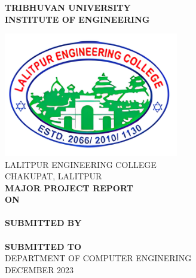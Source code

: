 \begin{center}

    \thispagestyle{empty}
    {\fontsize{16 pt}{12} \selectfont\textbf{TRIBHUVAN UNIVERSITY} \\
        \textbf{INSTITUTE OF ENGINEERING}} \\
    \vspace{0.3 in}

    \includegraphics[width= 3in ]{img/leclogo21.png} \\
    \vspace{0.05 in}
    LALITPUR ENGINEERING COLLEGE \\
    CHAKUPAT, LALITPUR \\

    \vspace{0.5 in}
    \textbf{MAJOR PROJECT REPORT}\\
    \textbf{ON}\\
    {\fontsize{16 pt}{12} \selectfont \textbf{\thetitle}}\\
    \vspace{1.1 in}
    \textbf{ SUBMITTED BY}  \\
    {\theauthor} \\
    \vspace{1 in}
    \textbf{ SUBMITTED TO}  \\
    DEPARTMENT OF COMPUTER ENGINERING \\
    \vspace{0.7 in}
    DECEMBER 2023 \\
\end{center}